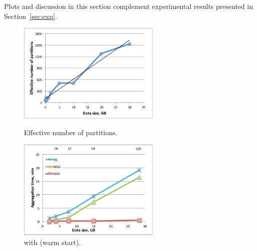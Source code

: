 \appendix \label{sec:app}

Plots and discussion in this section complement experimental results
presented in Section~\ref{sec:exp}.

\begin{figure}[t]
\centering
\begin{minipage}{3in}
  \centering
  \includegraphics[width=2.7in]{figs/partsfit.pdf}
\vspace{-0.1in}
  \caption{Effective number of partitions.}
  \label{fig:partsfit}
\vspace{-0.1in}
\end{minipage}
\begin{minipage}{3in}
  \centering
  \includegraphics[width=2.7in]{figs/tgroupu_warm.pdf}
\vspace{-0.1in}
  \caption{ with  (warm start).}
  \label{fig:tgroupu}
\vspace{-0.1in}
\end{minipage}
\end{figure}

